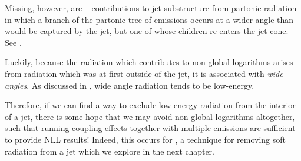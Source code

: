 Missing, however, are  -- contributions to jet substructure from partonic radiation in which a branch of the partonic tree of emissions occurs at a wider angle than would be captured by the jet, but one of whose children re-enters the jet cone.\cite{}
%
See \Fig{}.

Luckily, because the radiation which contributes to non-global logarithms arises from radiation which was at first outside of the jet, it is associated with \textit{wide angles}.
%
As discussed in  \Sec{}, wide angle radiation tends to be low-energy.

Therefore, if we can find a way to exclude low-energy radiation from the interior of a jet, there is some hope that we may avoid non-global logarithms altogether, such that running coupling effects together with multiple emissions are sufficient to provide NLL results!
%
Indeed, this occurs for , a technique for removing soft radiation from a jet which we explore in the next chapter.


